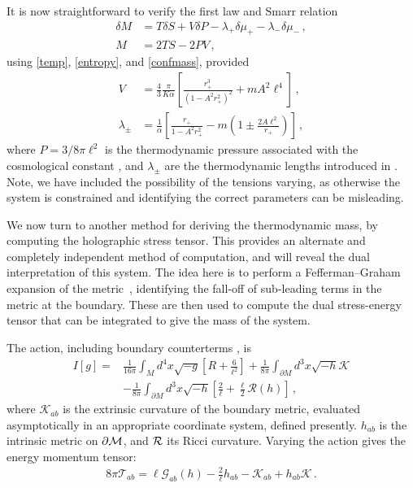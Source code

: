 \documentclass[
twoside,
openright,
frontopenright,
]{dmathesis}
\newcommand{\nn}{\nonumber}
\newcommand{\todoruth}[2][]{\todo[color=magenta!20,size=\footnotesize,#1]{#2}}
\begin{document}
It is now straightforward to verify the first law and Smarr \cite{Smarr:1972kt}
relation
\begin{align}
\delta M &=T\delta S+V\delta P-\lambda _{+}\delta \mu _{+}
-\lambda_{-}\delta \mu _{-}\,,  \nn \\
M &=2TS-2PV\,,
\end{align}
using \eqref{temp}, \eqref{entropy}, and \eqref{confmass},
provided
\begin{align}\label{vol}
V &= \frac{4}{3}\frac{\pi}{K \alpha}\left[\frac{r_+^3}{(1-A^2r_+^2)^2}
+mA^2\ell^4\right]\,,\nn \\
\lambda_\pm &= \frac{1}{\alpha}\left[\frac{r_+}{1-A^2r_+^2}
-m\left(1\pm\frac{2A\ell^2}{r_+}\right)\right]\,,
\end{align}
where $P = 3/8\pi \ell^2$ is the thermodynamic pressure associated with
the cosmological constant  \cite{Kubiznak:2016qmn}, and $\lambda_\pm$
are the thermodynamic lengths introduced in \cite{Appels:2017xoe,Gregory:2017ogk}.
{Note, we have} included the possibility of the tensions varying, as otherwise
the system is constrained and identifying the correct parameters can be
misleading.

We now turn to another method for deriving the thermodynamic mass,
by computing the holographic stress tensor. This provides an alternate
and completely independent method of computation, and will reveal
the dual interpretation of this system.  The idea here is to perform a
Fefferman--Graham expansion of the metric~\cite{Fefferman:2007rka}, identifying the
fall-off of sub-leading terms in the metric at the boundary. These are
then used to compute the dual stress-energy tensor that can be integrated
to give the mass of the system.

The action, including boundary counterterms
\cite{Balasubramanian:1999re, Emparan:1999pm, Mann:1999pc}, is
\begin{align}
I[g]=&\frac{1}{16\pi}\int_{M}d^{4}x\sqrt{-g}\left[ R+\frac{6}{\ell^{2}}\right]
+ \frac{1}{8\pi}\int_{\partial M}d^{3}x\sqrt{-h}\mathcal{K}\nn \\
&- \frac{1}{8\pi}\int_{\partial M}d^{3}x\sqrt{-h}
\left[ \frac{2}{\ell}+\frac{\ell}{2}\mathcal{R}\left( h\right) \right]\,,
\label{action}
\end{align}
where $\mathcal{K}_{ab}$ is the extrinsic curvature of the boundary
metric, evaluated asymptotically in an appropriate coordinate system,
defined presently. $h_{ab}$ is the intrinsic metric on
$\partial {\cal M}$, and ${\cal R}$ its Ricci curvature. Varying
the action gives the energy momentum tensor:
\begin{align}
8\pi \mathcal{T}_{ab} = \ell \mathcal{G}_{ab}\left(h\right)
-\frac{2}{\ell}h_{ab}-\mathcal{K}_{ab}+h_{ab}\mathcal{K}\,.
\end{align}%
\todoruth{Plot T?}
\end{document}
